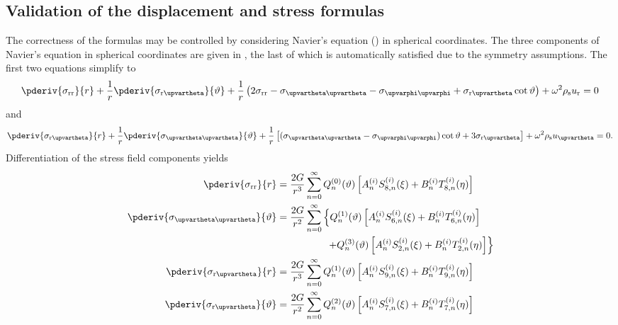 \subsection{Validation of the displacement and stress formulas}
The correctness of the formulas may be controlled by considering Navier's equation () in spherical coordinates. The three components of Navier's equation in spherical coordinates are given in , the last of which is automatically satisfied due to the symmetry assumptions. The first two equations simplify to
\begin{equation}\label{Eq1:navierSphericalSimplified1}%
\pderiv{\sigma_{\mathrm{rr}}}{r} + \frac{1}{r}\pderiv{\sigma_{\mathrm{r}\upvartheta}}{\vartheta} + \frac{1}{r}\left(2\sigma_{\mathrm{r}\mathrm{r}} - \sigma_{\upvartheta\upvartheta} - \sigma_{\upvarphi\upvarphi} + \sigma_{\mathrm{r}\upvartheta}\cot\vartheta\right) +\omega^2\rho_{\mathrm{s}}u_{\mathrm{r}} = 0
\end{equation}
and
\begin{equation}\label{Eq1:navierSphericalSimplified2}
\pderiv{\sigma_{\mathrm{r}\upvartheta}}{r} + \frac{1}{r}\pderiv{\sigma_{\upvartheta\upvartheta}}{\vartheta} + \frac{1}{r}\left[(\sigma_{\upvartheta\upvartheta} - \sigma_{\upvarphi\upvarphi})\cot\vartheta + 3\sigma_{\mathrm{r}\upvartheta} \right] +\omega^2\rho_{\mathrm{s}}u_\upvartheta = 0.
\end{equation}
Differentiation of the stress field components yields
\begin{align*}
	\pderiv{\sigma_{\mathrm{r}\mathrm{r}}}{r} &= \frac{2G}{r^3}\sum_{n=0}^\infty Q_n^{(0)}(\vartheta)\left[A_n^{(i)} S_{8,n}^{(i)}(\xi) + B_n^{(i)} T_{8,n}^{(i)}(\eta)\right]\\
	\pderiv{\sigma_{\upvartheta\upvartheta}}{\vartheta} &= \frac{2G}{r^2}\sum_{n=0}^\infty\left\{Q_n^{(1)}(\vartheta)\left[A_n^{(i)} S_{6,n}^{(i)}(\xi) + B_n^{(i)} T_{6,n}^{(i)}(\eta)\right] \right.\\ 
	&{\hskip5em\relax}\left. +  Q_n^{(3)}(\vartheta)\left[A_n^{(i)} S_{2,n}^{(i)}(\xi) + B_n^{(i)} T_{2,n}^{(i)}(\eta)\right]\right\}\\
	\pderiv{\sigma_{\mathrm{r}\upvartheta}}{r} &= \frac{2G}{r^3}\sum_{n=0}^\infty Q_n^{(1)}(\vartheta)\left[A_n^{(i)} S_{9,n}^{(i)}(\xi) + B_n^{(i)} T_{9,n}^{(i)}(\eta)\right]\\
	\pderiv{\sigma_{\mathrm{r}\upvartheta}}{\vartheta} &= \frac{2G}{r^2}\sum_{n=0}^\infty Q_n^{(2)}(\vartheta)\left[A_n^{(i)} S_{7,n}^{(i)}(\xi) + B_n^{(i)} T_{7,n}^{(i)}(\eta)\right]
\end{align*}

